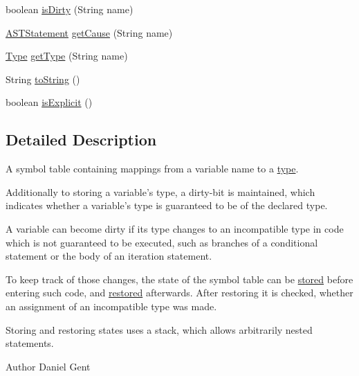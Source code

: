 \begin{DoxyCompactItemize}
\item 
boolean \hyperlink{classorg_1_1tzi_1_1use_1_1util_1_1soil_1_1_symbol_table_a101973b92731972aee644ed2bd92e3f5}{is\-Dirty} (String name)
\item 
\hyperlink{classorg_1_1tzi_1_1use_1_1parser_1_1soil_1_1ast_1_1_a_s_t_statement}{A\-S\-T\-Statement} \hyperlink{classorg_1_1tzi_1_1use_1_1util_1_1soil_1_1_symbol_table_a760f3142d6de2802eb59d83a954c3245}{get\-Cause} (String name)
\item 
\hyperlink{interfaceorg_1_1tzi_1_1use_1_1uml_1_1ocl_1_1type_1_1_type}{Type} \hyperlink{classorg_1_1tzi_1_1use_1_1util_1_1soil_1_1_symbol_table_aa0a973a4e8142bf8e2168c7205f53115}{get\-Type} (String name)
\item 
String \hyperlink{classorg_1_1tzi_1_1use_1_1util_1_1soil_1_1_symbol_table_a72f710b8ce0e23a958e937c5b71970de}{to\-String} ()
\item 
boolean \hyperlink{classorg_1_1tzi_1_1use_1_1util_1_1soil_1_1_symbol_table_a6a028ab1c24ba19ab7f9ef2dc3efd466}{is\-Explicit} ()
\end{DoxyCompactItemize}


\subsection{Detailed Description}
A symbol table containing mappings from a variable name to a \hyperlink{}{type}. 

Additionally to storing a variable's type, a dirty-\/bit is maintained, which indicates whether a variable's type is guaranteed to be of the declared type. 

A variable can become dirty if its type changes to an incompatible type in code which is not guaranteed to be executed, such as branches of a conditional statement or the body of an iteration statement. 

To keep track of those changes, the state of the symbol table can be \hyperlink{classorg_1_1tzi_1_1use_1_1util_1_1soil_1_1_symbol_table_a6d0403a85dae5f0a9c14839335eaa347}{stored} before entering such code, and \hyperlink{classorg_1_1tzi_1_1use_1_1util_1_1soil_1_1_symbol_table_a7ca26631ba443dd3b8d87710b24e351a}{restored} afterwards. After restoring it is checked, whether an assignment of an incompatible type was made. 

Storing and restoring states uses a stack, which allows arbitrarily nested statements.

\begin{DoxyAuthor}{Author}
Daniel Gent 
\end{DoxyAuthor}


